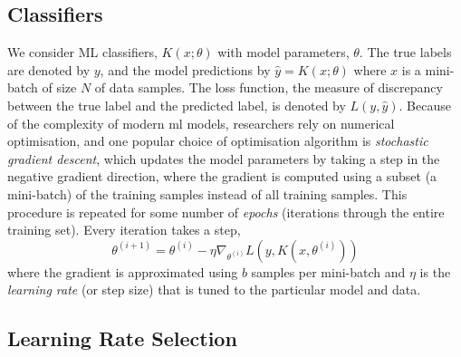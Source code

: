 \documentclass[sn-mathphys-num]{sn-jnl}%
\begin{document}
\subsection{Classifiers}

We consider ML classifiers, $K(x; \theta)$ with model parameters, $\theta$. The true labels are denoted by $y$, and the model predictions by $\hat{y} = K(x; \theta)$ where $x$ is a mini-batch of size $N$ of data samples. The loss function, the measure of discrepancy between the true label and the predicted label, is denoted by $L(y, \hat{y})$.
Because of the complexity of modern \acrshort{ml} models, researchers rely on numerical optimisation, and one popular choice of optimisation algorithm is \textit{stochastic gradient descent}, which updates the model parameters by taking a step in the negative gradient direction, where the gradient is computed using a subset (a mini-batch) of the training samples instead of all training samples.
This procedure is repeated for some number of \textit{epochs} (iterations through the entire training set). Every iteration takes a step,
\begin{equation}
    \theta^{(i+1)} = \theta^{(i)} - \eta \nabla_{\theta^{(i)}} L(y, K(x, \theta^{(i)}))
    \label{eq:sgd}
\end{equation}
where the gradient is approximated using $b$ samples per mini-batch and $\eta$ is the \textit{learning rate} (or step size) that is tuned to the particular model and data.


\subsection{Learning Rate Selection}
\label{learning_rate}
\end{document}
